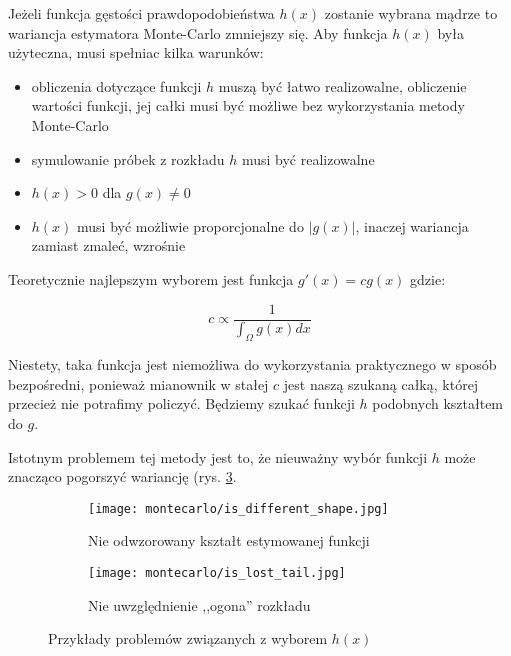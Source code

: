 \documentclass[../main.tex]{subfiles}
\begin{document}
Jeżeli funkcja gęstości prawdopodobieństwa $h(x)$ zostanie wybrana mądrze to
wariancja estymatora Monte-Carlo zmniejszy się. Aby funkcja $h(x)$ była
użyteczna, musi spełniac kilka warunków:

\begin{itemize}

  \item obliczenia dotyczące funkcji $h$ muszą być łatwo realizowalne,
    obliczenie wartości funkcji, jej całki musi być możliwe bez wykorzystania
    metody Monte-Carlo

  \item symulowanie próbek z rozkładu $h$ musi być realizowalne

  \item $h(x) > 0$ dla $g(x) \neq 0$

  \item $h(x)$ musi być możliwie proporcjonalne do $|g(x)|$, inaczej wariancja
    zamiast zmaleć, wzrośnie

\end{itemize}

Teoretycznie najlepszym wyborem jest funkcja $g'(x) = cg(x)$ gdzie:

\[
c \propto \frac{1}{\int_{\Omega}{g(x)dx}}
\]

\noindent Niestety, taka funkcja jest niemożliwa do wykorzystania praktycznego
w sposób bezpośredni, ponieważ mianownik w stałej $c$ jest naszą szukaną całką,
której przecież nie potrafimy policzyć. Będziemy szukać funkcji $h$ podobnych
kształtem do $g$.

Istotnym problemem tej metody jest to, że nieuważny wybór funkcji $h$ może
znacząco pogorszyć wariancję (rys. \ref{fig:ImportanceSamplingProblems}.

\begin{figure}
  \centering

  \begin{subfigure}[t]{0.45\textwidth}
    \texttt{[image: montecarlo/is\_different\_shape.jpg]}
    \label{fig:ImportanceSamplingWrongFunction}
    \caption{Nie odwzorowany kształt estymowanej funkcji}
  \end{subfigure}
  \begin{subfigure}[t]{0.45\textwidth}
    \centering
    \texttt{[image: montecarlo/is\_lost\_tail.jpg]}
    \label{fig:ImportanceSamplingLostTail}
    \caption{Nie uwzględnienie ,,ogona'' rozkładu}
  \end{subfigure}

  \label{fig:ImportanceSamplingProblems}
  \caption{Przykłady problemów związanych z wyborem $h(x)$}
\end{figure}
\end{document}
